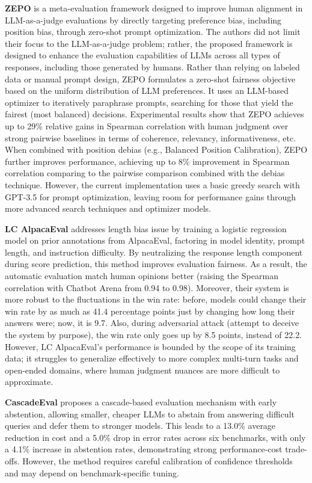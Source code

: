 \documentclass[sigconf, authoryear]{acmart}
\begin{document}
\textbf{ZEPO} is a meta-evaluation framework designed to improve human alignment in LLM-as-a-judge evaluations by directly targeting preference bias, including position bias, through zero-shot prompt optimization.
The authors did not limit their focus to the LLM-as-a-judge problem; rather, the proposed framework is designed to enhance the evaluation capabilities of LLMs across all types of responses, including those generated by humans.
Rather than relying on labeled data or manual prompt design, ZEPO formulates a zero-shot fairness objective based on the uniform distribution of LLM preferences.
It uses an LLM-based optimizer to iteratively paraphrase prompts, searching for those that yield the fairest (most balanced) decisions.
Experimental results show that ZEPO achieves up to 29\% relative gains in Spearman correlation with human judgment over strong pairwise baselines in terms of coherence, relevancy, informativeness, etc.
When combined with position debias (e.g., Balanced Position Calibration\cite{wang2023largelanguagemodelsfair}), ZEPO further improves performance, achieving up to 8\% improvement in Spearman correlation comparing to the pairwise comparison combined with the debias technique.
However, the current implementation uses a basic greedy search with GPT-3.5 for prompt optimization, leaving room for performance gains through more advanced search techniques and optimizer models\cite{zhou2024zepo}.

\textbf{LC AlpacaEval} addresses length bias issue by training a logistic regression model on prior annotations from AlpacaEval, factoring in model identity, prompt length, and instruction difficulty.
By neutralizing the response length component during score prediction, this method improves evaluation fairness.
As a result, the automatic evaluation match human opinions better (raising the Spearman correlation with Chatbot Arena from 0.94 to 0.98).
Moreover, their system is more robust to the fluctuations in the win rate: before, models could change their win rate by as much as 41.4 percentage points just by changing how long their answers were; now, it is 9.7.
Also, during adversarial attack (attempt to deceive the system by purpose), the win rate only goes up by 8.5 points, instead of 22.2.
However, LC AlpacaEval's performance is bounded by the scope of its training data; it struggles to generalize effectively to more complex multi-turn tasks and open-ended domains, where human judgment nuances are more difficult to approximate\cite{lc_alpacha}.


\textbf{CascadeEval} proposes a cascade-based evaluation mechanism with early abstention, allowing smaller, cheaper LLMs to abstain from answering difficult queries and defer them to stronger models.
This leads to a 13.0\% average reduction in cost and a 5.0\% drop in error rates across six benchmarks, with only a 4.1\% increase in abstention rates, demonstrating strong performance-cost trade-offs.
However, the method requires careful calibration of confidence thresholds and may depend on benchmark-specific tuning\cite{cascade_eval}.
\end{document}
